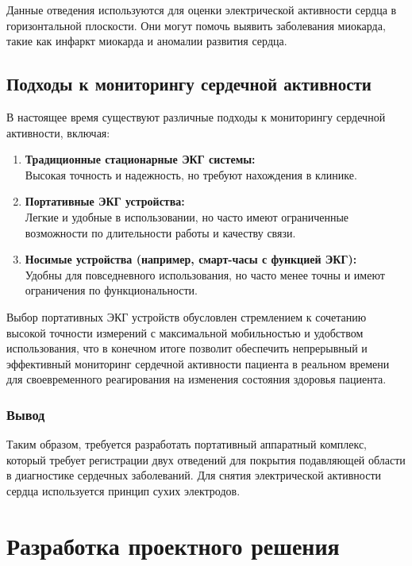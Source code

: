 \documentclass[12pt, russian]{extarticle}
\begin{document}
\begin{spacing}{1.5}
Данные отведения используются для оценки электрической активности сердца в горизонтальной плоскости. Они могут помочь выявить заболевания миокарда, такие как инфаркт миокарда и аномалии развития сердца.

\subsection{Подходы к мониторингу сердечной активности}

В настоящее время существуют различные подходы к мониторингу сердечной активности, включая:

\begin{enumerate}
    \item \textbf{Традиционные стационарные ЭКГ системы:} \\
        Высокая точность и надежность, но требуют нахождения в клинике.
    \item \textbf{Портативные ЭКГ устройства:} \\
        Легкие и удобные в использовании, но часто имеют ограниченные возможности по длительности работы и качеству связи.
    \item \textbf{Носимые устройства (например, смарт-часы с функцией ЭКГ):} \\ 
        Удобны для повседневного использования, но часто менее точны и имеют ограничения по функциональности.
\end{enumerate}

Выбор портативных ЭКГ устройств обусловлен стремлением к сочетанию высокой точности измерений с максимальной мобильностью и удобством использования, что в конечном итоге позволит обеспечить непрерывный и эффективный мониторинг сердечной активности пациента в реальном времени для своевременного реагирования на изменения состояния здоровья пациента.

\subsubsection{Вывод}

Таким образом, требуется разработать портативный аппаратный комплекс, который требует регистрации двух отведений для покрытия подавляющей области в диагностике сердечных заболеваний. Для снятия электрической активности сердца используется принцип сухих электродов.

\newpage
\section{Разработка проектного решения}


\end{spacing}
\end{document}
